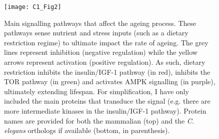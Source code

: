 \begin{figure}[htbp!] 
	\centering    
	\texttt{[image: C1\_Fig2]}
	\vspace*{1 mm}
	\caption[Main signalling pathways that affect the ageing process]{Main signalling pathways that affect the ageing process. These pathways sense nutrient and stress inputs (such as a dietary restriction regime) to ultimate impact the rate of ageing. The grey lines represent inhibition (negative regulation) while the yellow arrows represent activation (positive regulation). As such, dietary restriction inhibits the insulin/IGF-1 pathway (in red), inhibits the TOR pathway (in green) and activates AMPK signalling (in purple), ultimately extending lifespan. For simplification, I have only included the main proteins that transduce the signal (e.g. there are more intermediate kinases in the insulin/IGF-1 pathway). Protein names are provided for both the mammalian (top) and the \textit{C. elegans} orthologs if available (bottom, in parenthesis).}
	\label{fig:c1_fig2}
\end{figure}

